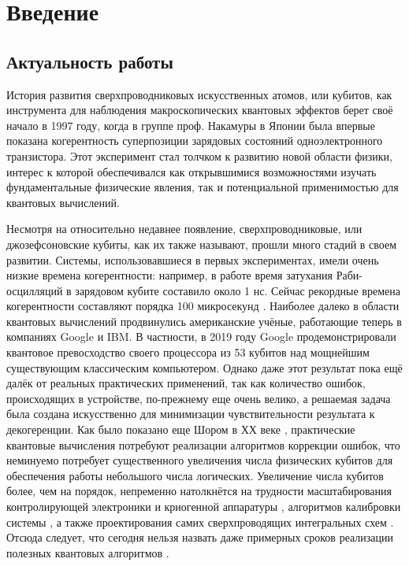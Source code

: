 \documentclass[14pt, a4paper]{extreport}
\numberwithin{equation}{section}
\begin{document}
\chapter*{Введение}

\section*{Актуальность работы}

История развития сверхпроводниковых искусственных атомов, или кубитов, как инструмента для наблюдения макроскопических квантовых эффектов берет своё начало в 1997 году, когда в группе проф. Накамуры в Японии была впервые показана \cite{nakamura1997spectroscopy} когерентность суперпозиции зарядовых состояний одноэлектронного транзистора. Этот эксперимент стал толчком к развитию новой области физики, интерес к которой обеспечивался как открывшимися возможностями изучать фундаментальные физические явления, так и потенциальной применимостью для квантовых вычислений.

Несмотря на относительно недавнее появление, сверхпроводниковые, или джозефсоновские кубиты, как их также называют, прошли много стадий в своем развитии. Системы, использовавшиеся в первых экспериментах, имели очень низкие времена когерентности: например, в работе \cite{nakamura1999coherent} время затухания Раби-осцилляций в зарядовом кубите составило около 1 нс. Сейчас рекордные времена когерентности составляют порядка 100 микросекунд \cite{kjaergaard2020superconducting}. Наиболее далеко в области квантовых вычислений продвинулись американские учёные, работающие теперь в компаниях Google и IBM. В частности, в 2019 году Google продемонстрировали \cite{arute2019quantum} квантовое превосходство своего процессора из 53 кубитов над мощнейшим существующим классическим компьютером. Однако даже этот результат пока ещё далёк от реальных практических применений, так как количество ошибок, происходящих в устройстве, по-прежнему еще очень велико, а решаемая задача была создана искусственно для минимизации чувствительности результата к декогеренции. Как было показано еще Шором в ХХ веке \cite{shor1995scheme}, практические квантовые вычисления потребуют реализации алгоритмов коррекции ошибок, что неминуемо потребует существенного увеличения числа физических кубитов для обеспечения работы небольшого числа логических. Увеличение числа кубитов более, чем на порядок, непременно натолкнётся на трудности масштабирования контролирующей электроники и криогенной аппаратуры \cite{krinner2019engineering}, алгоритмов калибровки системы \cite{arute2019quantum, kelly2018physical}, а также проектирования самих сверхпроводящих интегральных схем \cite{hutchings2017tunable}. Отсюда следует, что сегодня нельзя назвать даже примерных сроков реализации полезных квантовых алгоритмов \cite{arute2019quantum}.
\end{document}
